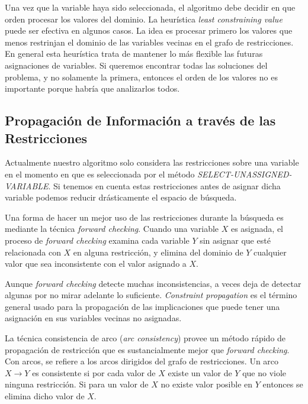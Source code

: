 Una vez que la variable haya sido seleccionada, el algoritmo debe decidir en que orden procesar los valores del dominio. La heur\'istica \emph{least constraining value} puede ser efectiva en algunos casos. La idea es procesar primero los valores que menos restrinjan el dominio de las variables vecinas en el grafo de restricciones. En general esta heur\'istica trata de mantener lo m\'as flexible las futuras asignaciones de variables. Si queremos encontrar todas las soluciones del problema, y no solamente la primera, entonces el orden de los valores no es importante porque habr\'ia que analizarlos todos.

\subsection{Propagaci\'on de Informaci\'on a trav\'es de las Restricciones}

Actualmente nuestro algoritmo solo considera las restricciones sobre una variable en el momento en que es seleccionada por el m\'etodo \emph{SELECT-UNASSIGNED-VARIABLE}. Si tenemos en cuenta estas restricciones antes de asignar dicha variable podemos reducir dr\'asticamente el espacio de b\'usqueda.

Una forma de hacer un mejor uso de las restricciones durante la b\'usqueda es mediante la t\'ecnica \emph{forward checking}. Cuando una variable $X$ es asignada, el proceso de \emph{forward checking} examina cada variable $Y$ sin asignar que est\'e relacionada con $X$ en alguna restricci\'on, y elimina del dominio de $Y$ cualquier valor que sea inconsistente con el valor asignado a $X$.

Aunque \emph{forward checking} detecte muchas inconsistencias, a veces deja de detectar algunas por no mirar adelante lo suficiente. \emph{Constraint propagation} es el t\'ermino general usado para la propagaci\'on de las implicaciones que puede tener una asignaci\'on en sus variables vecinas no asignadas.

La t\'ecnica consistencia de arco (\emph{arc consistency}) provee un m\'etodo r\'apido de propagaci\'on de restricci\'on que es sustancialmente mejor que \emph{forward checking}. Con arcos, se refiere a los arcos dirigidos del grafo de restricciones. Un arco $X \rightarrow Y$ es consistente si por cada valor de $X$ existe un valor de $Y$ que no viole ninguna restricci\'on. Si para un valor de $X$ no existe valor posible en $Y$ entonces se elimina dicho valor de $X$.

